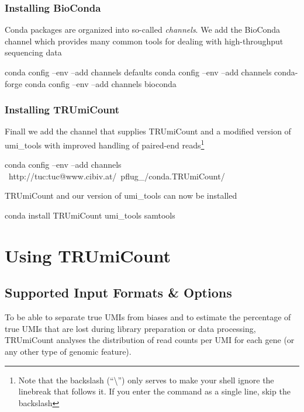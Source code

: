\documentclass[10pt]{article}
\begin{document}
\subsubsection*{Installing BioConda}

Conda packages are organized into so-called \emph{channels}. We add the BioConda channel which provides many common tools for dealing with high-throughput sequencing data

\begin{shellcode}
conda config --env --add channels defaults
conda config --env --add channels conda-forge
conda config --env --add channels bioconda
\end{shellcode}

\subsubsection*{Installing TRUmiCount}

Finall we add the channel that supplies TRUmiCount and a modified version of umi\_tools with improved handling of paired-end reads\footnote{Note that the backslash (``\textbackslash'') only serves to make your shell ignore the linebreak that follows it. If you enter the command as a single line, skip the backslash}

\begin{shellcode}
conda config --env --add channels \
  http://tuc:tuc@www.cibiv.at/~pflug_/conda.TRUmiCount/
\end{shellcode}

TRUmiCount and our version of umi\_tools can now be installed

\begin{shellcode}
conda install TRUmiCount umi_tools samtools
\end{shellcode}

\section{Using TRUmiCount}

\subsection{Supported Input Formats \& Options}

To be able to separate true UMIs from biases and to estimate the percentage of true UMIs that are lost during library preparation or data processing, TRUmiCount analyses the distribution of read counts per UMI for each gene (or any other type of genomic feature).
\end{document}
